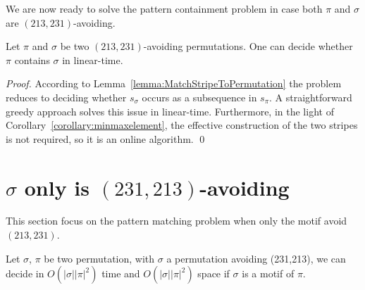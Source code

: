\documentclass[a4paper]{llncs}
\DeclareMathOperator{\AV}{Av}
\newcommand{\ptext}{\pi}
\newcommand{\pmotif}{\sigma}
\begin{document}
We are now ready to solve the pattern containment problem in case
both $\pi$ and $\sigma$ are $(213, 231)$-avoiding.

\begin{proposition}
	Let $\pi$ and $\sigma$ be two $(213,231)$-avoiding permutations.
	One can decide whether $\pi$ contains $\sigma$ in linear-time.
\end{proposition}

\begin{proof}
According to Lemma~\ref{lemma:MatchStripeToPermutation} the problem reduces 
to deciding whether $s_\sigma$ occurs as a subsequence in $s_\pi$. 
A straightforward greedy approach solves this issue in linear-time. 
Furthermore, in the light of Corollary~\ref{corollary:minmaxelement}, 
the effective construction of the two stripes is not required, 
so it is an online algorithm.
\qed
\end{proof}	


\section{$\sigma$ only is $(231,213)$-avoiding}	
\label{section:sigma only avoid 231 and 213}

This section focus on the pattern matching problem when only the motif avoid $(213,231)$.

\begin{proposition}
Let $\pmotif$, $\ptext$ 
be two permutation,
with  $\pmotif$ a permutation avoiding (231,213), 
we can decide in $O(|\pmotif||\ptext|^2)$ time
and $O(|\pmotif||\ptext|^2)$ space
if $\pmotif$ 
is a motif of $\ptext$.
\end{proposition}

			
\end{document}

